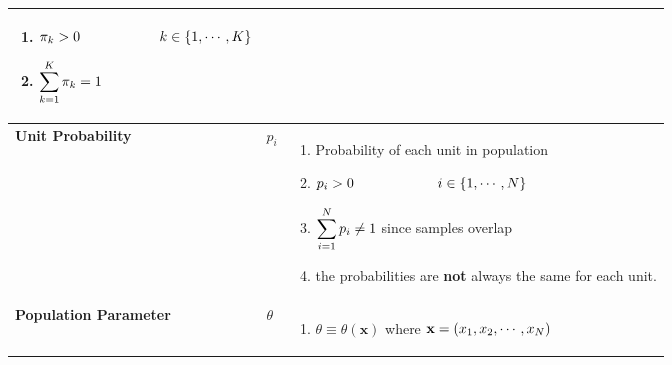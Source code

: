 \begin{customArrayStretch}{1.3}
\begin{longtable}{>{\RaggedRight\arraybackslash}p{4cm} >{\centering\arraybackslash}p{0.5cm} p{10.5cm}}
\begin{minipage}{10.3cm}
\begin{enumerate}
            \item $\pi_k > 0 \hspace{2cm}  k \in \left\{1,\cdots,K\right\}$
            \hfill \cite{statistics/book/Statistics-for-Data-Scientists/Maurits-Kaptein}

            \item $\displaystyle\sum_{k=1}^K \pi_k = 1$
            \hfill \cite{statistics/book/Statistics-for-Data-Scientists/Maurits-Kaptein}
        \end{enumerate}
        \vspace{0.15cm}
    \end{minipage}
    \\ \hline


\textbf{Unit Probability} &
    $p_i$ &
    \begin{minipage}{10.3cm}
        \vspace{0.15cm}
        \begin{enumerate}
            \item Probability of each unit in population
            \hfill \cite{statistics/book/Statistics-for-Data-Scientists/Maurits-Kaptein}

            \item $p_i > 0 \hspace{2cm} \ i \in \left\{1,\cdots,N\right\}$
            \hfill \cite{statistics/book/Statistics-for-Data-Scientists/Maurits-Kaptein}

            \item $\displaystyle\sum_{i=1}^N p_i \neq 1$ since samples overlap
            \hfill \cite{statistics/book/Statistics-for-Data-Scientists/Maurits-Kaptein}

            \item the probabilities are \textbf{not} always the same for each unit.
            \hfill \cite{statistics/book/Statistics-for-Data-Scientists/Maurits-Kaptein}

        \end{enumerate}
        \vspace{0.15cm}
    \end{minipage}
    \\ \hline


\textbf{Population Parameter} &
    $\theta$ &
    \begin{minipage}{10.3cm}
        \vspace{0.15cm}
        \begin{enumerate}
            \item $\theta \equiv \theta(\mathbf{x})$ where $\mathbf{x} = \left(x_1, x_2, \cdots, x_N\right)$
            \hfill \cite{statistics/book/Statistics-for-Data-Scientists/Maurits-Kaptein}


\end{enumerate}
\end{minipage}
\end{longtable}
\end{customArrayStretch}

